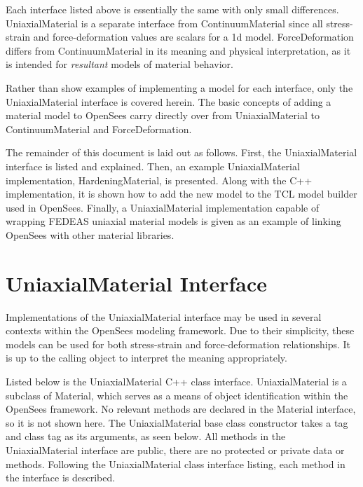 \documentclass[12pt]{article}
\begin{document}
\noindent Each interface listed above is essentially the same with only small differences.
UniaxialMaterial is a separate interface from ContinuumMaterial since all stress-strain and
force-deformation values 
are scalars for a 1d model. ForceDeformation differs from ContinuumMaterial in its meaning and
physical interpretation, as it
is intended for {\em resultant} models of material behavior.

Rather than show examples of implementing
a model for each interface, only the UniaxialMaterial interface is covered herein. The
basic concepts of adding a material model to OpenSees carry directly over from UniaxialMaterial
to ContinuumMaterial and ForceDeformation.

The remainder of this document is laid out as follows. First, the UniaxialMaterial interface is 
listed and explained. Then, an example UniaxialMaterial
implementation, HardeningMaterial, is presented. Along with the C++ implementation, it is shown how
to add the new model to the TCL model builder used in OpenSees. Finally, a UniaxialMaterial
implementation capable of wrapping FEDEAS uniaxial material models is given as an example
of linking OpenSees with other material libraries.

\section{UniaxialMaterial Interface}
Implementations of the UniaxialMaterial interface may be used in several contexts within
the OpenSees modeling framework. Due to their simplicity, these models can be used for both
stress-strain and force-deformation relationships. It is up to the calling object to interpret
the meaning appropriately.

Listed below is the UniaxialMaterial C++ class interface. UniaxialMaterial is a subclass of
Material, which serves as a means of object identification within the OpenSees framework.
No relevant methods are declared in the Material interface, so it is not shown here. The 
UniaxialMaterial base class
constructor takes a tag and class tag as its arguments, as seen below.
All methods in the UniaxialMaterial interface are public, there are no protected or
private data or methods.
Following the UniaxialMaterial class interface listing, each method in the interface is
described.
\end{document}
